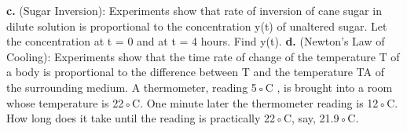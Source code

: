 \documentclass{report}
\begin{document}
\textbf{c.} (Sugar Inversion): Experiments show that rate of inversion of cane sugar in dilute solution is proportional to the concentration y(t) of unaltered sugar. Let the concentration at t = 0 and at t = 4 hours. Find y(t).
\textbf{d.} (Newton's Law of Cooling): Experiments show that the time rate of change of the temperature T of a body is proportional to the difference between T and the temperature TA of the surrounding medium. A thermometer, reading 5◦C , is brought into a room whose temperature is 22◦C. One minute later the thermometer reading is 12◦C. How long does it take until the reading is practically 22◦C, say, 21.9◦C.\\
\end{document}
